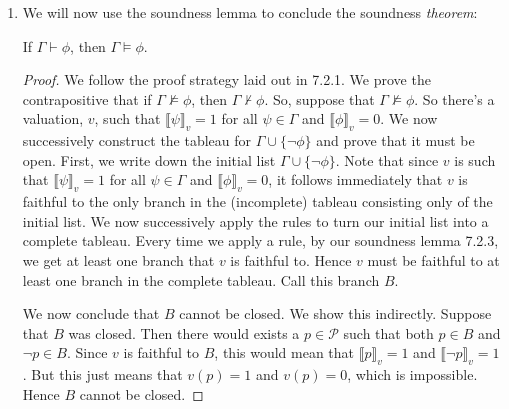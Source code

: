 \begin{enumerate}[\thesection.1]
\begin{proof}
\begin{enumerate}[(a)]
			is applied, which gives us one new branch $B'=B\cup\{\phi,\neg\psi\}$. Since $v$ is faithful to $B$ and $\neg(\phi\to\psi)\in B$, we get that $\llbracket\neg(\phi\to\psi)\rrbracket_v=1$. From this, since $\llbracket\neg(\phi\to\psi)\rrbracket_v=1-max(1-\llbracket\phi\rrbracket_v, \llbracket\psi\rrbracket_v)$, we get that $max(1-\llbracket\phi\rrbracket_v, \llbracket\psi\rrbracket_v)=0$. So $\llbracket\phi\rrbracket_v=1$ and $\llbracket\psi\rrbracket_v=0$. Since $\llbracket\neg\psi\rrbracket_v=1-\llbracket\psi\rrbracket_v$, we can conclude  $\llbracket\neg\psi\rrbracket_v=1$. But now, since $v$ was faithful to $B$, $B'=B\cup\{\phi,\neg\psi\}$, and $\llbracket\phi\rrbracket_v=1$ as well as $\llbracket\neg\psi\rrbracket_v=1$, we get that $v$ is faithful to $B'$.
			
	\end{enumerate}
	The remaining cases work similarly and you should work them out yourself.
	\end{proof}
	
	\item We will now use the soundness lemma to conclude the soundness \emph{theorem}:
	\begin{theorem}
	If $\Gamma\vdash\phi$, then $\Gamma\vDash\phi$.
	\end{theorem}
	\begin{proof}
	We follow the proof strategy laid out in 7.2.1. We prove the contrapositive that if $\Gamma\nvDash\phi$, then $\Gamma\nvdash\phi$. So, suppose that $\Gamma\nvDash\phi$. So there's a valuation, $v$, such that $\llbracket \psi\rrbracket_v=1$ for all $\psi\in\Gamma$ and $\llbracket\phi\rrbracket_v=0$. We now successively construct the tableau for $\Gamma\cup\{\neg\phi\}$ and prove that it must be open. First, we write down the initial list $\Gamma\cup\{\neg\phi\}$. Note that since $v$ is such that $\llbracket \psi\rrbracket_v=1$ for all $\psi\in\Gamma$ and $\llbracket\phi\rrbracket_v=0$, it follows immediately that $v$ is faithful to the only branch in the (incomplete) tableau consisting only of the initial list. We now successively apply the rules to turn our initial list into a complete tableau. Every time we apply a rule, by our soundness lemma 7.2.3, we get at least one branch that $v$ is faithful to. Hence $v$ must be faithful to at least one branch in the complete tableau. Call this branch $B$.
	
	We now conclude that $B$ cannot be closed. We show this indirectly. Suppose that $B$ was closed. Then there would exists a $p\in\mathcal{P}$ such that both $p\in B$ and $\neg p\in B$. Since $v$ is faithful to $B$, this would mean that $\llbracket p\rrbracket_v=1$ and $\llbracket\neg p\rrbracket_v=1$. But this just means that $v(p)=1$ and $v(p)=0$, which is impossible. Hence $B$ cannot be closed. 
	

\end{proof}
\end{enumerate}
